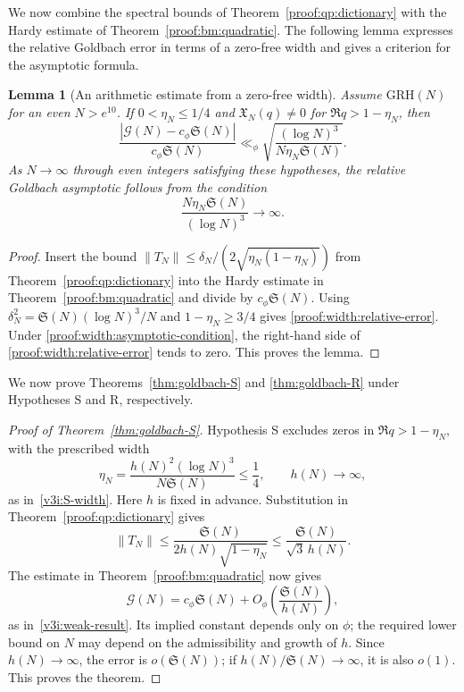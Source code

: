 \documentclass[12pt,a4paper]{amsart}
\numberwithin{equation}{section}
\def\le{\leqslant}
\def\ge{\geqslant}
\theoremstyle{plain}
\newtheorem{lemma}[proposition]{Lemma}
\theoremstyle{definition}
\theoremstyle{remark}
\begin{document}
We now combine the spectral bounds of Theorem~\ref{proof:qp:dictionary}
with the Hardy estimate of Theorem~\ref{proof:bm:quadratic}.
The following lemma expresses the relative Goldbach error in terms
of a zero-free width and gives a criterion for the asymptotic formula.

\begin{lemma}[An arithmetic estimate from a zero-free width]
\label{proof:v9:width-arithmetic-estimate}
Assume $\mathrm{GRH}(N)$ for an even $N>e^{10}$.
If $0<\eta_N\le1/4$ and $\mathfrak X_N(q)\ne0$ for
$\Re q>1-\eta_N$, then
\begin{equation}\label{proof:width:relative-error}
 \frac{|\mathcal G(N)-c_\phi\mathfrak S(N)|}{c_\phi\mathfrak S(N)}
 \ll_\phi\sqrt{\frac{(\log N)^3}{N\eta_N\mathfrak S(N)}}.
\end{equation}
As $N\to\infty$ through even integers satisfying these hypotheses,
the relative Goldbach asymptotic follows from the condition
\begin{equation}\label{proof:width:asymptotic-condition}
 \frac{N\eta_N\mathfrak S(N)}{(\log N)^3}\longrightarrow\infty.
\end{equation}
\end{lemma}

\begin{proof}
Insert the bound
$\|T_N\|\le\delta_N/(2\sqrt{\eta_N(1-\eta_N)})$
from Theorem~\ref{proof:qp:dictionary} into the Hardy estimate in
Theorem~\ref{proof:bm:quadratic} and divide by
$c_\phi\mathfrak S(N)$.
Using $\delta_N^2=\mathfrak S(N)(\log N)^3/N$ and
$1-\eta_N\ge3/4$ gives \eqref{proof:width:relative-error}.
Under \eqref{proof:width:asymptotic-condition}, the right-hand side
of \eqref{proof:width:relative-error} tends to zero.
This proves the lemma.
\end{proof}

We now prove Theorems~\ref{thm:goldbach-S} and \ref{thm:goldbach-R}
under Hypotheses S and R, respectively.

\begin{proof}[Proof of Theorem~\ref{thm:goldbach-S}]
Hypothesis S excludes zeros in $\Re q>1-\eta_N$, with the
prescribed width
\[
 \eta_N=\frac{h(N)^2(\log N)^3}{N\mathfrak S(N)}\le\frac14,
 \qquad h(N)\longrightarrow\infty,
\]
as in~\eqref{v3i:S-width}.
Here $h$ is fixed in advance. Substitution in
Theorem~\ref{proof:qp:dictionary} gives
\[
 \|T_N\|\le\frac{\mathfrak S(N)}{2h(N)\sqrt{1-\eta_N}}
          \le\frac{\mathfrak S(N)}{\sqrt3\,h(N)}.
\]
The estimate in Theorem~\ref{proof:bm:quadratic} now gives
\[
 \mathcal G(N)=c_\phi\mathfrak S(N)
                   +O_\phi\!\left(\frac{\mathfrak S(N)}{h(N)}\right),
\]
as in~\eqref{v3i:weak-result}.
Its implied constant depends only on $\phi$; the required lower
bound on $N$ may depend on the admissibility and growth of $h$.
Since $h(N)\to\infty$, the error is $o(\mathfrak S(N))$;
if $h(N)/\mathfrak S(N)\to\infty$, it is also $o(1)$.
This proves the theorem.
\end{proof}
\end{document}
